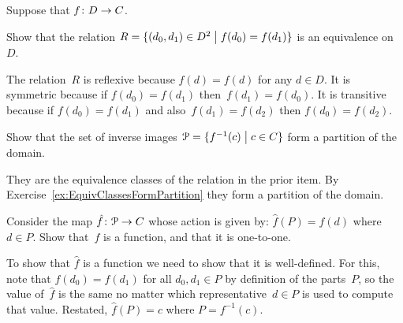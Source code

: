 \documentclass{test}  %
\begin{document}
\begin{problem}
\end{problem}

\begin{problem}
Suppose that $\mbox{$f\colon D\to C$}$.
\begin{exes}
\begin{exercise} 
  Show that the relation
  $R=\{(d_0,d_1)\in D^2 \bigm| f(d_0)=f(d_1)\}$ 
  is an equivalence on~$D$.
\end{exercise} 
\begin{answer}
  The relation~$R$ is reflexive because $f(d)=f(d)$ for any $d\in D$.
  It is symmetric because if $f(d_0)=f(d_1)$ then~$f(d_1)=f(d_0)$.
  It is transitive because if $f(d_0)=f(d_1)$ and also~$f(d_1)=f(d_2)$ 
  then $f(d_0)=f(d_2)$.  
\end{answer}
\begin{exercise} 
  Show that the set of inverse images 
  $\EuScript{P}=\{f^{-1}(c) \bigm| c\in C\}$ form a partition of the domain.
\end{exercise}
\begin{answer}
  They are the equivalence classes of the relation in the prior 
  item.
  By Exercise~\ref{ex:EquivClassesFormPartition} they form a
  partition of the domain.  
\end{answer}
\begin{exercise} 
  Consider the map
  $\mbox{$\hat{f}\colon \EuScript{P}\to C$}$ whose action is given by:
  $\hat{f}(P)=f(d)$ where $d\in P$.
  Show that~$\hat{f}$ is a function, and that it is one-to-one.
\end{exercise}
\begin{answer}
  To show that $\hat{f}$ is a function we need to show that
  it is well-defined.
  For this, note that $f(d_0)=f(d_1)$ for all $d_0,d_1\in P$
  by definition of the parts~$P$, so 
  the value of~$\hat{f}$ is the same no matter which representative~$d\in P$
  is used to compute that value.
  Restated, $\hat{f}(P)=c$ where $P=f^{-1}(c)$.


\end{answer}
\end{exes}
\end{problem}
\end{document}
